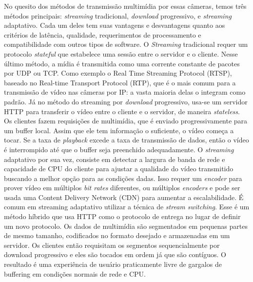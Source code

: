 \documentclass[12pt, %
openright, 
oneside, %
a4paper,    %
brazil]{facom-ufu-abntex2}
\begin{document}
No quesito dos métodos de transmissão multimídia por essas câmeras, temos três
métodos principais: \textit{\foreignlanguage{english}{streaming}} tradicional,
\textit{\foreignlanguage{english}{download}} progressivo, e
\textit{\foreignlanguage{english}{streaming}} adaptativo. Cada um deles tem
suas vantagens e desvantagens quanto aos critérios de latência, qualidade,
requerimentos de processamento e compatibilidade com outros tipos de software.
O \textit{\foreignlanguage{english}{Streaming}} tradicional requer um protocolo
\textit{\foreignlanguage{english}{stateful}} que estabelece uma sessão entre o
servidor e o cliente. Nesse último método, a mídia é transmitida como uma
corrente constante de pacotes por UDP ou TCP. Como exemplo o Real Time
Streaming Protocol (RTSP), baseado no Real-time Transport Protocol (RTP), que é
o mais comum para a transmissão de vídeo nas câmeras por IP: a vasta maioria
delas o integram como padrão. Já no método do streaming por
\textit{\foreignlanguage{english}{download}} progressivo, usa-se um servidor
HTTP para transferir o vídeo entre o cliente e o servidor, de maneira
\textit{\foreignlanguage{english}{stateless}}. Os clientes fazem requisições de
multimídia, que é enviado progressivamente para um buffer local. Assim que ele
tem informação o suficiente, o vídeo começa a tocar. Se a taxa de
\textit{\foreignlanguage{english}{playback}} excede a taxa de transmissão de
dados, então o vídeo é interrompido até que o buffer seja preenchido
adequadamente. O \textit{\foreignlanguage{english}{streaming}} adaptativo por
sua vez, consiste em detectar a largura de banda de rede e capacidade de CPU do
cliente para ajustar a qualidade do vídeo transmitido buscando a melhor opção
para as condições dadas. Isso requer um
\textit{\foreignlanguage{english}{encoder}} para prover vídeo em múltiplos
\textit{\foreignlanguage{english}{bit rates}} diferentes, ou múltiplos
\textit{\foreignlanguage{english}{encoders}} e pode ser usada uma Content
Delivery Network (CDN) para aumentar a escalabilidade. É comum em streaming
adaptativo utilizar a técnica de \textit{\foreignlanguage{english}{stream
		switching}}. Esse é um método híbrido que usa HTTP como o protocolo de entrega
no lugar de definir um novo protocolo. Os dados de multimídia são segmentados
em pequenas partes de mesmo tamanho, codificados no formato desejado e
armazenadas em um servidor. Os clientes então requisitam os segmentos
sequencialmente por download progressivo e eles são tocados em ordem já que são
contíguos. O resultado é uma experiência de usuário praticamente livre de
gargalos de buffering em condições normais de rede e CPU.
\end{document}
